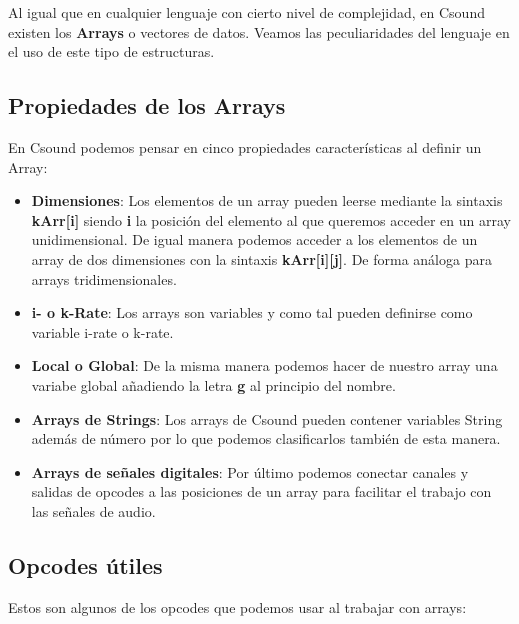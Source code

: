 Al igual que en cualquier lenguaje con cierto nivel de complejidad, en Csound existen los \textbf{Arrays} o vectores de datos. Veamos las peculiaridades del lenguaje en el uso de este tipo de estructuras.

\subsection{Propiedades de los Arrays}

En Csound podemos pensar en cinco propiedades características al definir un Array:

\begin{itemize}
 \item \textbf{Dimensiones}: Los elementos de un array pueden leerse mediante la sintaxis \textbf{kArr[i]} siendo \textbf{i} la posición del elemento al que queremos acceder en un array unidimensional. De igual manera podemos acceder a los elementos de un array de dos dimensiones con la sintaxis \textbf{kArr[i][j]}. De forma análoga para arrays tridimensionales.
 \item \textbf{i- o k-Rate}: Los arrays son variables y como tal pueden definirse como variable i-rate o k-rate.
 \item \textbf{Local o Global}: De la misma manera podemos hacer de nuestro array una variabe global añadiendo la letra \textbf{g} al principio del nombre.
 \item \textbf{Arrays de Strings}: Los arrays de Csound pueden contener variables String además de número por lo que podemos clasificarlos también de esta manera.
 \item \textbf{Arrays de señales digitales}: Por último podemos conectar canales y salidas de opcodes a las posiciones de un array para facilitar el trabajo con las señales de audio.
\end{itemize}
\pagebreak

\subsection{Opcodes útiles}

Estos son algunos de los opcodes que podemos usar al trabajar con arrays:

